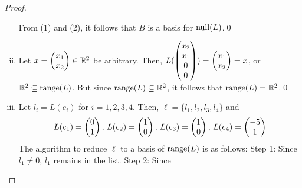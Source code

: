 \begin{proof}
\begin{enumerate}[(i)]
        From (1) and (2), it follows that $B$ is a basis for $\textnormal{null}(L)$.\qed
        \item Let $x=\begin{pmatrix} x_1\\ x_2\end{pmatrix}\in\mathbb R^2$ be arbitrary. Then, $L(\begin{pmatrix} x_2\\ x_1\\0 \\ 0\end{pmatrix})=\begin{pmatrix} x_1\\ x_2\end{pmatrix}=x$, or $\mathbb R^2\subseteq\textnormal{range}(L)$.
        But since $\textnormal{range}(L)\subseteq\mathbb R^2$, it follows that $\textnormal{range}(L)=\mathbb R^2$.\qed
        \item Let $l_i=L(e_i)$ for $i=1,2,3,4$.
        Then, $\ell=\{l_1,l_2,l_3,l_4\}$ and 
        \[
            \begin{aligned}
                L(e_1)=\begin{pmatrix} 0\\ 1\end{pmatrix},\,L(e_2)=\begin{pmatrix} 1\\ 0\end{pmatrix},\,L(e_3)=\begin{pmatrix} 1\\ 0\end{pmatrix},\,L(e_4)=\begin{pmatrix} -5\\ 1\end{pmatrix}
            \end{aligned}
        \]
        The algorithm to reduce $\ell$ to a basis of $\textnormal{range}(L)$ is as follows:
        Step 1: Since $l_1\not=0$, $l_1$ remains in the list.
        Step 2: Since 
    \end{enumerate}
    \renewcommand{\qedsymbol}{}
\end{proof}